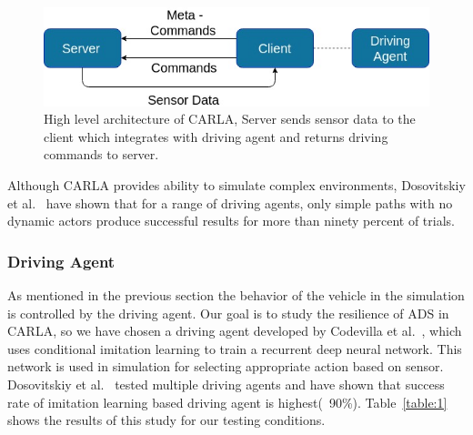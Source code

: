  \begin{figure}  [h]
 	\vspace{-0.5em}
 	\centering
 	\includegraphics[scale=0.4]{CARLA_block}
 	\vspace{-0.5em}
 	\caption{High level architecture of CARLA, Server sends sensor data to the client which integrates with driving agent and returns driving commands to server.}
 	\label{fig:carla_arch}
 	\vspace{-1.5em}
 \end{figure}
 
 \bigskip
 
 
 Although CARLA provides ability to simulate complex environments, Dosovitskiy et al.~\cite{Dosovitskiy17} have shown that for a range of driving agents, only simple paths with no dynamic actors produce successful results for more than ninety percent of trials.
 
 \medskip
 
 \subsubsection{Driving Agent}
 As mentioned in the previous section the behavior of the vehicle in the simulation is controlled by the driving agent. Our goal is to study the resilience of ADS in CARLA, so we have chosen a driving agent developed by Codevilla et al.~\cite{Codevilla2018}, which uses conditional imitation learning to train a recurrent deep neural network. This network is used in simulation for selecting appropriate action based on sensor. Dosovitskiy et al.~\cite{Dosovitskiy17} tested multiple driving agents and have shown that success rate of imitation learning based driving agent is highest(~90\%). Table~\ref{table:1} shows the results of this study for our testing conditions.
 
